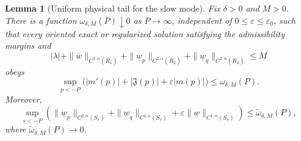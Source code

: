\documentclass[11pt,reqno]{amsart}
\numberwithin{equation}{section}
\newtheorem{lemma}[theorem]{Lemma}
\theoremstyle{definition}
\theoremstyle{remark}
\begin{document}
\begin{lemma}[Uniform physical tail for the slow mode]
\label{lem5dw:mean-tail}
Fix $\delta>0$ and $M>0$.  There is a function
$\omega_{\delta,M}(P)\downarrow0$ as $P\to\infty$, independent of
$0\le\varepsilon\le\varepsilon_0$, such that every oriented exact or
regularized solution satisfying the admissibility margins and
\[
 |\lambda|+\|\overline w\|_{C^{3,\alpha}(\overline R_1)}
 +\|\underline w_p\|_{C^{2,\alpha}(\overline R_2)}
 +\|\underline w_q\|_{C^{2,\alpha}(\overline R_2)}\le M
\]
obeys
\begin{equation}\label{eq5dw:mean-tail}
 \sup_{p<-P}\bigl(|m'(p)|+|\mathfrak J(p)|
 +\varepsilon|m(p)|\bigr)\le\omega_{\delta,M}(P).
\end{equation}
Moreover,
\begin{equation}\label{eq5dw:derivative-tail}
 \sup_{s<-P}\left(
 \|\underline w_p\|_{C^{2,\alpha}(S_s)}
 +\|\underline w_q\|_{C^{2,\alpha}(S_s)}
 +\varepsilon\|\underline w\|_{C^{1,\alpha}(S_s)}
 \right)\le\widetilde\omega_{\delta,M}(P),
\end{equation}
where $\widetilde\omega_{\delta,M}(P)\to0$.
\end{lemma}
\end{document}
